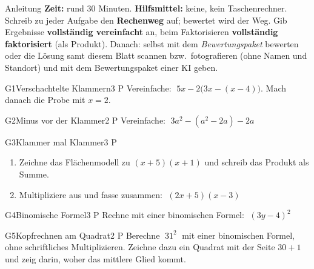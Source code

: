 \documentclass[11pt]{article}
\begin{document}

\begin{lpinfo}{Anleitung}
\textbf{Zeit:} rund 30 Minuten. \textbf{Hilfsmittel:} keine, kein Taschenrechner.
Schreib zu jeder Aufgabe den \textbf{Rechenweg} auf; bewertet wird der Weg. Gib Ergebnisse \textbf{vollständig vereinfacht}
an, beim Faktorisieren \textbf{vollständig faktorisiert} (als Produkt).
Danach: selbst mit dem \emph{Bewertungspaket} bewerten oder die Lösung samt diesem Blatt scannen bzw.\ fotografieren
(ohne Namen und Standort) und mit dem Bewertungspaket einer KI geben.
\end{lpinfo}


\begin{lpaufgabe}{G1}{Verschachtelte Klammern}{3 P}
Vereinfache: $\;5x - 2\bigl(3x - (x - 4)\bigr)$. Mach danach die Probe mit $x = 2$.
\end{lpaufgabe}

\begin{lpaufgabe}{G2}{Minus vor der Klammer}{2 P}
Vereinfache: $\;3a^2 - (a^2 - 2a) - 2a$
\end{lpaufgabe}


\begin{lpaufgabe}{G3}{Klammer mal Klammer}{3 P}
\begin{enumerate}[label=(\alph*),leftmargin=*,itemsep=3pt]
\item Zeichne das Flächenmodell zu $(x + 5)(x + 1)$ und schreib das Produkt als Summe.
\item Multipliziere aus und fasse zusammen: $\;(2x + 5)(x - 3)$
\end{enumerate}
\end{lpaufgabe}

\begin{lpaufgabe}{G4}{Binomische Formel}{3 P}
Rechne mit einer binomischen Formel: $\;(3y - 4)^2$
\end{lpaufgabe}

\begin{lpaufgabe}{G5}{Kopfrechnen am Quadrat}{2 P}
Berechne $\;31^2\;$ mit einer binomischen Formel, ohne schriftliches Multiplizieren. Zeichne dazu ein Quadrat mit der
Seite $30 + 1$ und zeig darin, woher das mittlere Glied kommt.
\end{lpaufgabe}
\end{document}
